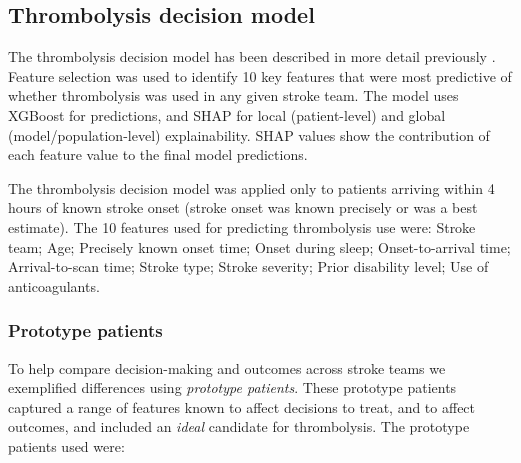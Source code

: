 \subsection{Thrombolysis decision model}

The thrombolysis decision model has been described in more detail previously \cite{pearn_what_2023}. Feature selection was used to identify 10 key features that were most predictive of whether thrombolysis was used in any given stroke team. The model uses XGBoost \cite{chen_xgboost_2016} for predictions, and SHAP \cite{lundberg_unified_2017} for local (patient-level) and global (model/population-level) explainability. SHAP values show the contribution of each feature value to the final model predictions.

The thrombolysis decision model was applied only to patients arriving within 4 hours of known stroke onset (stroke onset was known precisely or was a best estimate). The 10 features used for predicting thrombolysis use were: Stroke team; Age; Precisely known onset time; Onset during sleep; Onset-to-arrival time; Arrival-to-scan time; Stroke type; Stroke severity; Prior disability level; Use of anticoagulants.


\subsubsection{Prototype patients}

To help compare decision-making and outcomes across stroke teams we exemplified differences using \textit{prototype patients}. These prototype patients captured a range of features known to affect decisions to treat, and to affect outcomes, and included an \textit{ideal} candidate for thrombolysis. The prototype patients used were:


